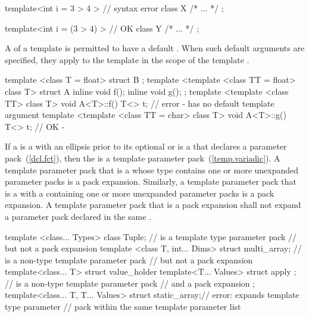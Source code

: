 \begin{codeblock}
template<int i = 3 > 4 >        // syntax error
class X { /* ... */ };

template<int i = (3 > 4) >      // OK
class Y { /* ... */ };
\end{codeblock}
\exitexample

\pnum
A
of a template
is permitted to have a default
.
When such default arguments are specified, they apply to the template
in the scope of the template
.
\enterexample
\begin{codeblock}
template <class T = float> struct B {};
template <template <class TT = float> class T> struct A {
  inline void f();
  inline void g();
};
template <template <class TT> class T> void A<T>::f() {
  T<> t;            // error -  has no default template argument
}
template <template <class TT = char> class T> void A<T>::g() {
    T<> t;          // OK - 
}
\end{codeblock}
\exitexample

\pnum
If a  is a
 with an ellipsis prior to its
optional  or is a
 that declares a parameter
pack~(\ref{dcl.fct}), then the 
is a template parameter pack~(\ref{temp.variadic}).
A template parameter pack that is a  whose type
contains one or more unexpanded parameter packs is a pack expansion. Similarly,
a template parameter pack that is a  with a
 containing one or more unexpanded
parameter packs is a pack expansion. A template parameter pack that is a pack
expansion shall not expand a parameter pack declared in the same
.
\enterexample
\begin{codeblock}
template <class... Types> class Tuple;                //  is a template type parameter pack
                                                      // but not a pack expansion
template <class T, int... Dims> struct multi_array;   //  is a non-type template parameter pack
                                                      // but not a pack expansion
template<class... T> struct value_holder {
  template<T... Values> struct apply { };             //  is a non-type template parameter pack
                                                      // and a pack expansion
};
template<class... T, T... Values> struct static_array;// error:  expands template type parameter
                                                      // pack  within the same template parameter list
\end{codeblock}
\exitexample

